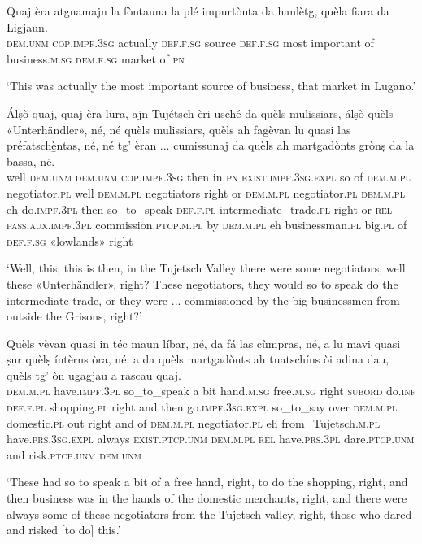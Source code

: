 \begin{linenumbers}
\gll Quaj èra atgnamajn la fòntauna la plé impurtònta da hanlètg, quèla fiara\footnotemark{} da Ligjaun.\\
\textsc{dem.unm} \textsc{cop.impf.3sg} actually  \textsc{def.f.sg} source \textsc{def.f.sg} most important of business.\textsc{m.sg} \textsc{dem.f.sg} market of \textsc{pn}\\
\end{linenumbers}
\medskip
\glt `This was actually the most important source of  business, that market in Lugano.'
\medskip
 
\begin{linenumbers}
\gll Álṣò quaj, quaj èra lura, ajn Tujétsch èri usché da quèls mulissiars, álṣò quèls «Unterhändler»\footnotemark, né, né quèls mulissiars, quèls ah fagèvan lu quasi las préfatschè̱ntas, né, né tg’ èran ... cumissunaj da quèls ah martgadònts grònṣ da la bassa, né.\\
well \textsc{dem.unm} \textsc{dem.unm} \textsc{cop.impf.3sg} then in \textsc{pn} \textsc{exist.impf.3sg.expl} so of \textsc{dem.m.pl} negotiator.\textsc{pl} well \textsc{dem.m.pl} negotiators right or \textsc{dem.m.pl} negotiator.\textsc{pl} \textsc{dem.m.pl} eh do.\textsc{impf.3pl} then so\_to\_speak \textsc{def.f.pl}  intermediate\_trade.\textsc{pl} right or \textsc{rel} \textsc{pass.aux.impf.3pl} {} commission.\textsc{ptcp.m.pl} by \textsc{dem.m.pl} eh businessman.\textsc{pl} big.\textsc{pl} of \textsc{def.f.sg} «lowlands» right \\
\end{linenumbers}
\medskip
 \glt `Well, this, this is then, in the Tujetsch Valley there were some negotiators, well these «Unterhändler», right? These negotiators, they would so to speak do the intermediate trade, or they were ... commissioned by the big businessmen from outside the Grisons, right?'
\medskip

\begin{linenumbers}
\gll Quèls vèvan quasi in téc maun líbar, né, da fá las cùmpras, né, a lu mavi quasi ṣur quèlṣ íntèrns òra, né, a da quèls martgadònts ah tuatschíns òi adina dau, quèls tg’ òn ugagjau a rascau quaj.\\
  \textsc{dem.m.pl} have.\textsc{impf.3pl} so\_to\_speak a bit hand.\textsc{m.sg} free.\textsc{m.sg} right \textsc{subord} do.\textsc{inf} \textsc{def.f.pl} shopping.\textsc{pl} right and then go.\textsc{impf.3sg.expl} so\_to\_say over \textsc{dem.m.pl} domestic.\textsc{pl} out right and of \textsc{dem.m.pl} negotiator.\textsc{pl} eh from\_Tujetsch.\textsc{m.pl} have.\textsc{prs.3sg}.\textsc{expl} always \textsc{exist.ptcp.unm} \textsc{dem.m.pl} \textsc{rel} have.\textsc{prs.3pl} dare.\textsc{ptcp.unm} and risk.\textsc{ptcp.unm} \textsc{dem.unm}\\
\end{linenumbers}
\medskip
\glt `These had so to speak a bit of a free hand, right, to do the shopping, right, and then business was in the hands of the domestic merchants, right, and there were always some of these negotiators from the Tujetsch valley, right, those who dared and risked [to do] this.'
\medskip

